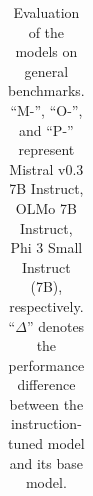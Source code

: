 \documentclass[11pt]{article}
\begin{document}
\begin{table}[t]
{\begin{tabular}{cccccc}
    \end{tabular}
    }
    \caption{Evaluation of the models on general benchmarks.
    ``M-'', ``O-'', and ``P-'' represent Mistral v0.3 7B Instruct, OLMo 7B Instruct, Phi 3 Small Instruct (7B), respectively.
    ``$\Delta$'' denotes the performance difference between the instruction-tuned model and its base model.
    }
    \label{tab:general}
\end{table}




\end{document}
